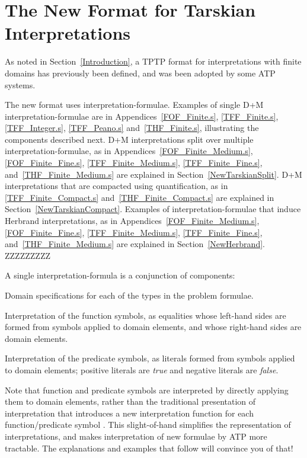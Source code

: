 \documentclass{easychair}
\newenvironment{packed_itemize}{
\vspace*{-0.2em}
\begin{itemize}
\setlength{\partopsep}{0pt}
\setlength{\itemsep}{1pt}
\setlength{\parskip}{0pt}
\setlength{\parsep}{0pt}
}{\end{itemize}}
\begin{document}
\section{The New Format for Tarskian Interpretations}
\label{NewTarskian}

As noted in Section~\ref{Introduction}, a TPTP format for interpretations with finite domains 
has previously been defined, and was been adopted by some ATP systems.

The new format uses interpretation-formulae.
Examples of single {\sf D+M} interpretation-formulae are in Appendices~\ref{FOF_Finite.s}, 
\ref{TFF_Finite.s}, \ref{TFF_Integer.s}, \ref{TFF_Peano.s} and~\ref{THF_Finite.s}, illustrating 
the components described next. 
{\sf D+M} interpretations split over multiple interpretation-formulae, as in 
Appendices~\ref{FOF_Finite_Medium.s}, \ref{FOF_Finite_Fine.s}, \ref{TFF_Finite_Medium.s}, 
\ref{TFF_Finite_Fine.s}, and~\ref{THF_Finite_Medium.s} are explained in 
Section~\ref{NewTarskianSplit}.
{\sf D+M} interpretations that are compacted using quantification, as in \ref{TFF_Finite_Compact.s}
and~\ref{THF_Finite_Compact.s} are explained in Section~\ref{NewTarskianCompact}.
Examples of interpretation-formulae that induce Herbrand interpretations, as in 
Appendices~\ref{FOF_Finite_Medium.s}, \ref{FOF_Finite_Fine.s}, \ref{TFF_Finite_Medium.s},
\ref{TFF_Finite_Fine.s}, and~\ref{THF_Finite_Medium.s} are explained in
Section~\ref{NewHerbrand}.
ZZZZZZZZZ

A single interpretation-formula is a conjunction of components:
\begin{packed_itemize}
\item Domain specifications for each of the types in the problem formulae.
\item Interpretation of the function symbols, as equalities whose left-hand sides are formed from 
      symbols applied to domain elements, and whose right-hand sides are domain elements.
\item Interpretation of the predicate symbols, as literals formed from symbols applied
      to domain elements; positive literals are {\em true} and negative literals are {\em false}.
\end{packed_itemize}

Note that function and predicate symbols are interpreted by directly applying them to domain
elements, rather than the traditional presentation of interpretation that introduces a new
interpretation function for each function/predicate symbol \cite[p.999]{Gal15}.
This slight-of-hand simplifies the representation of interpretations, and makes interpretation
of new formulae by ATP more tractable.
The explanations and examples that follow will convince you of that!
\end{document}
